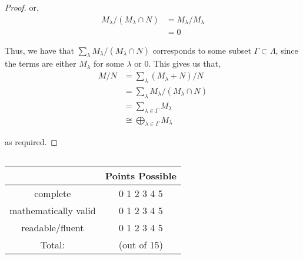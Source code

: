 \documentclass[11pt, reqno]{amsart}
\theoremstyle{plain}
\theoremstyle{definition}
\theoremstyle{example}
\newcommand{\Rubric}[1]{$~$\\\vfill \hfill{\def\arraystretch{1.75}\begin{tabular} {|c|c|} \hline
#1 & Points Possible  \\ \hline \hline
complete & \hspace{3mm} 0 \hspace{3mm} 1 \hspace{3mm} 2 \hspace{3mm} 
			3 \hspace{3mm} 4 \hspace{3mm} 5 \hspace{3mm} \\ \hline
mathematically valid & \hspace{3mm} 0 \hspace{3mm} 1 \hspace{3mm} 2 \hspace{3mm} 
			3 \hspace{3mm} 4 \hspace{3mm} 5 \hspace{3mm} \\ \hline
readable/fluent & \hspace{3mm} 0 \hspace{3mm} 1 \hspace{3mm} 2 \hspace{3mm} 
			3 \hspace{3mm} 4 \hspace{3mm} 5 \hspace{3mm} \\ \hline
Total:& \qquad\qquad\qquad(out of 15)\\
\hline
\end{tabular}}
\pagebreak}
\begin{document}
\begin{proof}
or,
\begin{align*}
M_{\lambda}/(M_{\lambda} \cap N) &= M_{\lambda}/M_{\lambda}\\
&= 0
\end{align*}

Thus, we have that $\sum_{\lambda} M_{\lambda}/(M_{\lambda} \cap N)$ corresponds to some subset $\Gamma \subset \Lambda$, since the terms are either $M_{\lambda}$ for some $\lambda$ or $0$. This gives us that,
\begin{align*}
M/N &= \sum_{\lambda} (M_{\lambda} + N)/N\\
&= \sum_{\lambda} M_{\lambda}/(M_{\lambda} \cap N)\\
&= \sum_{\lambda \in \Gamma} M_{\lambda}\\
&\cong \bigoplus_{\lambda \in \Gamma}M_\lambda
\end{align*}

as required.
\end{proof}

\Rubric{}
\end{document}
